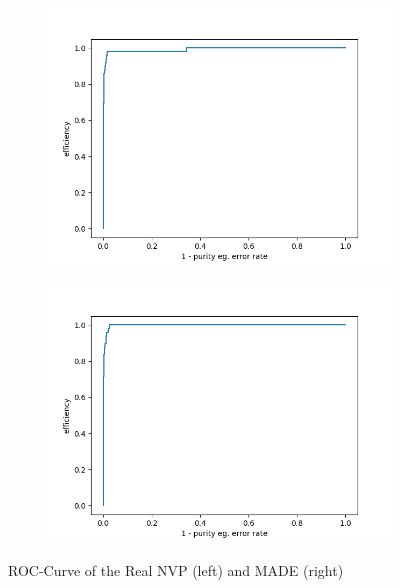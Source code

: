 \documentclass[%
 reprint,
 amsmath,amssymb,
 aps,
]{revtex4-2}
\begin{document}
 \begin{figure}[ht]
	\centering
	\begin{subfigure}[h]{0.4\textwidth}
		\centering
		\includegraphics[width=\textwidth]{figs/ROC_validation_Real_NVP.png}   
	\end{subfigure}
	\hfill
	\begin{subfigure}[h]{0.4\textwidth}  
		\centering 
		\includegraphics[width=\textwidth]{figs/ROC_validation_MADE.png}
	\end{subfigure}
	\caption[ ROC-Curve of the Real NVP (left) and MADE (right)]
	{\small ROC-Curve of the Real NVP (left) and MADE (right)} 
	\label{fig:ROC}
\end{figure}
\end{document}
